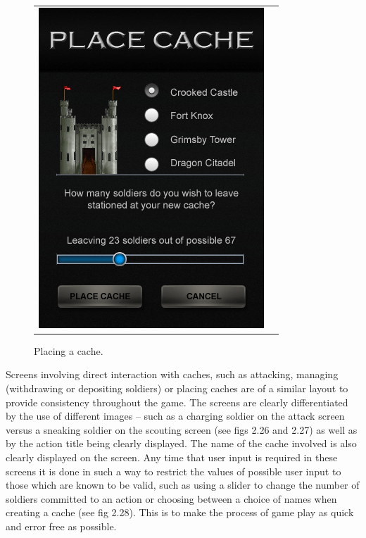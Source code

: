 \begin{figure}[h!]
\begin{tabular}{cc}
\begin{minipage}{0.3\textwidth}
\begin{center}
\begin{minipage}{0.83\textwidth}
		\includegraphics[width=\textwidth]{images/place_cache_mockup}
	\caption{Placing a cache.}
		\label{placing_cache}
		\end{minipage}
		\end{center}
	\end{minipage}
\end{tabular}
\vspace{-0pt}
\end{figure}

 Screens involving direct interaction with caches, such as attacking, managing (withdrawing or depositing soldiers) or placing caches are of a similar layout to provide consistency throughout the game. The screens are clearly differentiated by the use of different images – such as a charging soldier on the attack screen versus a sneaking soldier on the scouting screen (see figs 2.26 and 2.27) as well as by the action title being clearly displayed. The name of the cache involved is also clearly displayed on the screen. Any time that user input is required in these screens it is done in such a way to restrict the values of possible user input to those which are known to be valid, such as using a slider to change the number of soldiers committed to an action or choosing between a choice of names when creating a cache (see fig 2.28). This is to make the process of game play as quick and error free as possible.

